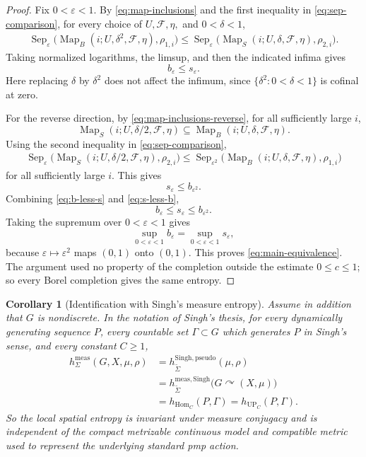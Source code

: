 \documentclass[12pt]{amsart}
\newtheorem{corollary}[corollary]{Corollary}
\theoremstyle{definition}
\newcommand{\Map}{\operatorname{Map}}
\newcommand{\Sep}{\operatorname{Sep}}
\newcommand{\1}{\mathbf 1}
\newcommand{\eps}{\varepsilon}
\begin{document}
\begin{proof}
	Fix $0<\eps<1$. By \eqref{eq:map-inclusions} and the first inequality in
	\eqref{eq:sep-comparison}, for every choice of
	$U,\mathcal F,\eta,$ and $0<\delta<1$,
	\begin{align*}
		\Sep_\eps
		\bigl(\Map_B(i;U,\delta^2,\mathcal F,\eta),\rho_{1,i}\bigr)\le
		\Sep_\eps
		\bigl(\Map_S(i;U,\delta,\mathcal F,\eta),\rho_{2,i}\bigr).
	\end{align*}
	Taking normalized logarithms, the limsup, and then the indicated infima gives
	\begin{equation}\label{eq:b-less-s}
		b_\eps\le s_\eps.
	\end{equation}
	Here replacing $\delta$ by $\delta^2$ does not affect the infimum, since
	$\{\delta^2:0<\delta<1\}$ is cofinal at zero.

	For the reverse direction, by \eqref{eq:map-inclusions-reverse}, for all sufficiently large $i$,
	\[
	\Map_S(i;U,\delta/2,\mathcal F,\eta)
	\subseteq\Map_B(i;U,\delta,\mathcal F,\eta).
	\]
	Using the second inequality in \eqref{eq:sep-comparison},
	\begin{align*}
		\Sep_\eps
		\bigl(\Map_S(i;U,\delta/2,\mathcal F,\eta),\rho_{2,i}\bigr)
		\le
		\Sep_{\eps^2}
		\bigl(\Map_B(i;U,\delta,\mathcal F,\eta),\rho_{1,i}\bigr)
	\end{align*}
	for all sufficiently large $i$. This gives
	\begin{equation}\label{eq:s-less-b}
		s_\eps\le b_{\eps^2}.
	\end{equation}
	Combining \eqref{eq:b-less-s} and \eqref{eq:s-less-b},
	\[
	b_\eps\le s_\eps\le b_{\eps^2}.
	\]
	Taking the supremum over $0<\eps<1$ gives
	\[
	\sup_{0<\eps<1}b_\eps
	=\sup_{0<\eps<1}s_\eps,
	\]
	because $\eps\mapsto\eps^2$ maps $(0,1)$ onto $(0,1)$. This proves
	\eqref{eq:main-equivalence}. The argument used no property of the completion
	outside the estimate $0\le c\le1$; so every Borel completion gives the same
	entropy.
\end{proof}

	\begin{corollary}[Identification with Singh's measure entropy]
	\label{cor:singh-measure-identification}
	Assume in addition that $G$ is nondiscrete. In the notation of Singh's
	thesis, for every dynamically generating sequence $P$, every countable set
	$\Gamma\subset G$ which generates $P$ in Singh's sense, and every
	constant $C\geq1$,
	\begin{align*}
		h^{\mathrm{meas}}_\Sigma(G,X,\mu,\rho)
		&=h_{\widetilde\Sigma}^{\mathrm{Singh,pseudo}}(\mu,\rho)\\
		&=h_{\widetilde\Sigma}^{\mathrm{meas,Singh}}
		\bigl(G\curvearrowright(X,\mu)\bigr)\\
		&=h_{\operatorname{Hom}_C}(P,\Gamma)
		=h_{\operatorname{UP}_C}(P,\Gamma).
	\end{align*}
	So the local spatial entropy is invariant under measure
	conjugacy and is independent of the compact metrizable continuous model and
	compatible metric used to represent the underlying standard pmp action.
\end{corollary}
\end{document}
